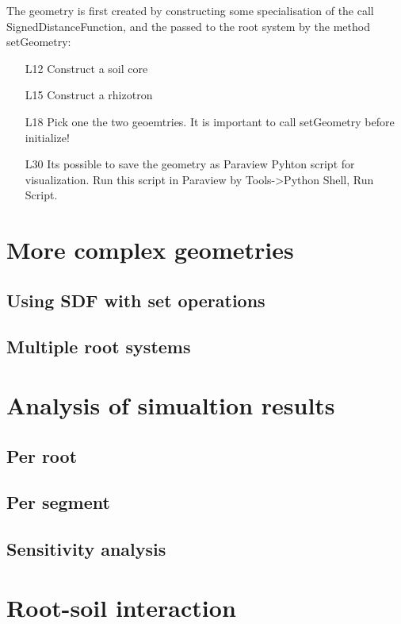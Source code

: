 \documentclass[a4paper]{article}
\begin{document}
The geometry is first created by constructing some specialisation of the call SignedDistanceFunction, and the passed to the root system by the method setGeometry: 
\begin{itemize}
 \item[L12] Construct a soil core 
 \item[L15] Construct a rhizotron
 \item[L18] Pick one the two geoemtries. It is important to call setGeometry before initialize!
 \item[L30] Its possible to save the geometry as Paraview Pyhton script for visualization. Run this script in Paraview by Tools->Python Shell, Run Script.
\end{itemize}




\section{More complex geometries}

\subsection{Using SDF with set operations}

\subsection{Multiple root systems}



\section{Analysis of simualtion results}

\subsection{Per root}

\subsection{Per segment}

\subsection{Sensitivity analysis} \label{sec:sa}



\section{Root-soil interaction}
\end{document}
